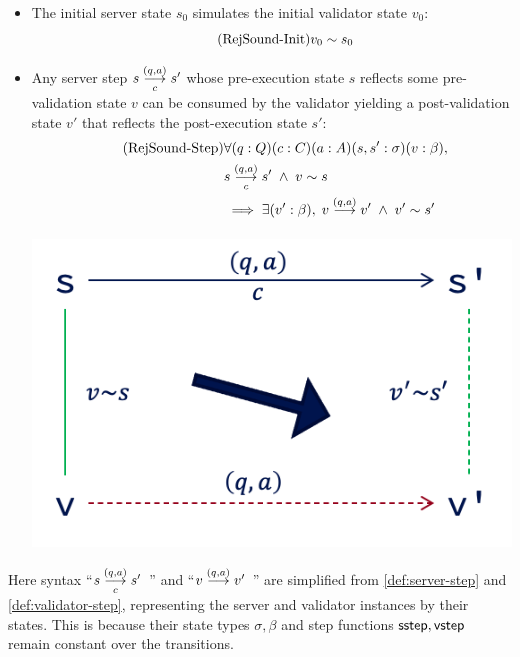 \begin{itemize}
\item The initial server state $s_0$ simulates the initial validator state $v_0$:
  \begin{equation}
    \tag{RejSound-Init}
    \label{eq:rs1}
    v_0\sim s_0
  \end{equation}
\item Any server step $\triggers sc{(q,a)}s'$ whose pre-execution state $s$
  reflects some pre-validation state $v$ can be consumed by the validator
  yielding a post-validation state $v'$ that reflects the post-execution state
  $s'$:
  \begin{align*}
    \tag{RejSound-Step}
    \label{eq:rs2}
    &\forall(q:Q)(c:C)(a:A)(s,s':\sigma)(v:\beta),\\
    &\triggers sc{(q,a)}s'\;\wedge\;\Reflects{v}{s}\\
    &\implies\exists(v':\beta),\;\behaves v{(q,a)}v'\;\wedge\;\Reflects{v'}{s'}
  \end{align*}
  \begin{center}
    \includegraphics[width=.5\textwidth]{figures/sound}
  \end{center}
\end{itemize}

Here syntax ``$\triggers sc{(q,a)}s'$~'' and ``$\behaves v{(q,a)}v'$~'' are
simplified from \autoref{def:server-step} and \autoref{def:validator-step},
representing the server and validator instances by their states.  This is
because their state types $\sigma,\beta$ and step functions $\mathsf{sstep},\mathsf{vstep}$
remain constant over the transitions.

